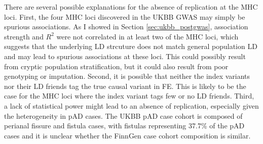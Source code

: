 There are several possible explanations for the absence of replication at the MHC loci. First, the four MHC loci discovered in the UKBB GWAS may simply be spurious associations. As I showed in Section \ref{sec:ukbb_postgwas}, association strength and $R^{2}$ were not correlated in at least two of the MHC loci, which suggests that the underlying LD strcuture does not match general population LD and may lead to spurious associations at these loci. This could possibly result from cryptic population stratification, but it could also result from poor genotyping or imputation. Second, it is possible that neither the index variants nor their LD friends tag the true causal variant in FE. This is likely to be the case for the MHC loci where the index variant tags few or no LD friends. Third, a lack of statistical power might lead to an absence of replication, especially given the heterogeneity in pAD cases. The UKBB pAD case cohort is composed of perianal fissure and fistula cases, with fistulas representing 37.7\% of the pAD cases and it is unclear whether the FinnGen case cohort composition is similar. \\



